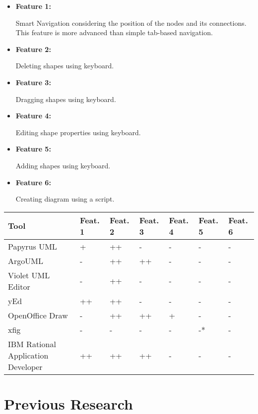 \begin{itemize}
\item {\bf Feature 1:}
\par \noindent
Smart Navigation considering the position of the nodes and its connections. This feature is more advanced than simple tab-based navigation.

\item {\bf Feature 2:}
\par \noindent
Deleting shapes using keyboard.

\item {\bf Feature 3:}
\par \noindent
Dragging shapes using keyboard.

\item {\bf Feature 4:}
\par \noindent
Editing shape properties using keyboard.

\item {\bf Feature 5:}
\par \noindent
Adding shapes using keyboard.

\item {\bf Feature 6:}
\par \noindent
Creating diagram using a script.
\end{itemize}

\begin{center}
	\begin{tabular}{ | p{3.5cm} | l | l | l | l | l | l |}
	\hline
	{\bf Tool} & {\bf Feat. 1} & {\bf Feat. 2} & {\bf Feat. 3} & {\bf Feat. 4} & {\bf Feat. 5} & {\bf Feat. 6}\\ \hline \hline 
	Papyrus UML & + & ++ & - & - & - & -\\ \hline
	ArgoUML & - & ++ & ++ & - & - & -\\ \hline
	Violet UML Editor & - & ++ & - & - & - & -\\ \hline
	yEd & ++ & ++ & - & - & - & -\\ \hline
	OpenOffice Draw & - & ++ & ++ & + & - & -\\ \hline
	xfig & - & - & - & - & -* & -\\ \hline
	IBM Rational Application Developer & ++ & ++ & ++ & - & - & -\\
	\hline
	\end{tabular}
\end{center}


\section{Previous Research}
